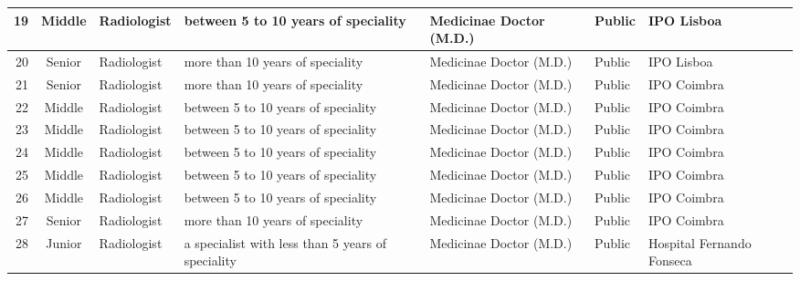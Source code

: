 \begin{landscape}
\begin{table}[htbp]
{\begin{tabular}{|r|c|l|l|l|l|l|}
19          & Middle         & Radiologist                      & between 5 to 10 years of speciality                   & Medicinae Doctor (M.D.)                       & Public               & IPO Lisboa                \\ \hline
20          & Senior         & Radiologist                      & more than 10 years of speciality                      & Medicinae Doctor (M.D.)                       & Public               & IPO Lisboa                \\ \hline
21          & Senior         & Radiologist                      & more than 10 years of speciality                      & Medicinae Doctor (M.D.)                       & Public               & IPO Coimbra               \\ \hline
22          & Middle         & Radiologist                      & between 5 to 10 years of speciality                   & Medicinae Doctor (M.D.)                       & Public               & IPO Coimbra               \\ \hline
23          & Middle         & Radiologist                      & between 5 to 10 years of speciality                   & Medicinae Doctor (M.D.)                       & Public               & IPO Coimbra               \\ \hline
24          & Middle         & Radiologist                      & between 5 to 10 years of speciality                   & Medicinae Doctor (M.D.)                       & Public               & IPO Coimbra               \\ \hline
25          & Middle         & Radiologist                      & between 5 to 10 years of speciality                   & Medicinae Doctor (M.D.)                       & Public               & IPO Coimbra               \\ \hline
26          & Middle         & Radiologist                      & between 5 to 10 years of speciality                   & Medicinae Doctor (M.D.)                       & Public               & IPO Coimbra               \\ \hline
27          & Senior         & Radiologist                      & more than 10 years of speciality                      & Medicinae Doctor (M.D.)                       & Public               & IPO Coimbra               \\ \hline
28          & Junior         & Radiologist                      & a specialist with less than 5 years of speciality     & Medicinae Doctor (M.D.)                       & Public               & Hospital Fernando Fonseca \\ \hline

\end{tabular}}
\end{table}
\end{landscape}
